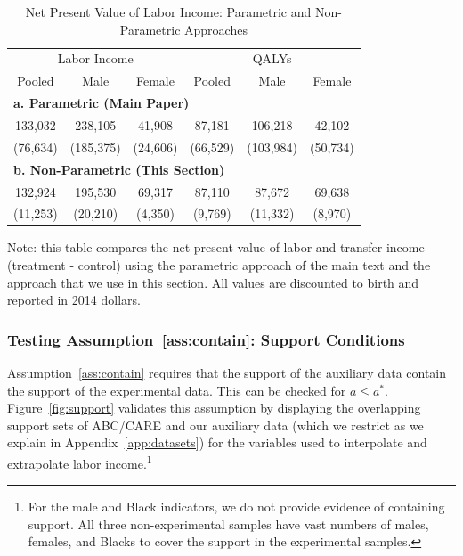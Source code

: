\begin{table}[H]
\begin{threeparttable}
\caption{Net Present Value of Labor Income: Parametric and Non-Parametric Approaches}
\label{table:nvpli}
\centering
\begin{tabular}{ccc|ccc} \toprule
\multicolumn{3}{c}{Labor Income} & \multicolumn{3}{c}{QALYs} \\
Pooled & Male & Female & Pooled & Male & Female   \\ \midrule
\multicolumn{6}{l}{\textbf{a. Parametric (Main Paper)}} \\
133,032 & 238,105 & 41,908 & 87,181 & 106,218 & 42,102\\
(76,634) & (185,375) & (24,606) & (66,529) & (103,984) & (50,734)\\
\multicolumn{6}{l}{\textbf{b. Non-Parametric (This Section)}} \\
132,924 & 195,530 & 69,317 & 87,110 & 87,672 & 69,638  \\
(11,253) & (20,210) & (4,350) & (9,769) & (11,332) & (8,970) \\ \bottomrule
\end{tabular}
\begin{tablenotes}
\footnotesize
\item Note: this table compares the net-present value of labor and transfer income (treatment - control) using the parametric approach of the main text and the approach that we use in this section. All values are discounted to birth and reported in 2014 dollars.
\end{tablenotes}
\end{threeparttable}
\end{table}

\subsubsection{Testing Assumption~\ref{ass:contain}: Support Conditions}\label{app:containsupport}

Assumption~\ref{ass:contain} requires that the support of the auxiliary data contain the support of the experimental data. This can be checked for $a \leq a^\ast$. Figure~\ref{fig:support} validates this assumption by displaying the overlapping support sets of ABC/CARE and our auxiliary data (which we restrict as we explain in Appendix~\ref{app:datasets}) for the variables used to interpolate and extrapolate labor income.\footnote{For the male and Black indicators, we do not provide evidence of containing support. All three non-experimental samples have vast numbers of males, females, and Blacks to cover the support in the experimental samples.}


